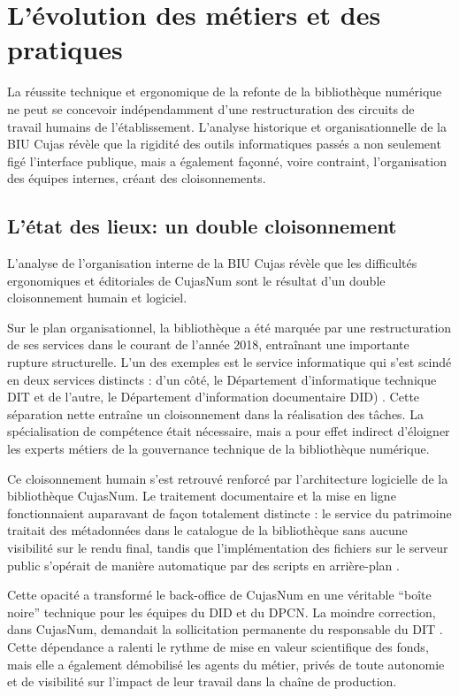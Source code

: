 \section{L'évolution des métiers et des pratiques}
La réussite technique et ergonomique de la refonte de la bibliothèque numérique ne peut se concevoir indépendamment d'une restructuration des circuits de travail humains de l'établissement. L'analyse historique et organisationnelle de la \ac{BIU Cujas} révèle que la rigidité des outils informatiques passés a non seulement figé l'interface publique, mais a également façonné, voire contraint, l'organisation des équipes internes, créant des cloisonnements.

\subsection{L'état des lieux: un double cloisonnement}
L'analyse de l'organisation interne de la \ac{BIU Cujas} révèle que les difficultés ergonomiques et éditoriales de CujasNum sont le résultat d'un double cloisonnement humain et logiciel.

Sur le plan organisationnel, la bibliothèque a été marquée par une restructuration de ses services dans le courant de l'année 2018, entraînant une importante rupture structurelle. L'un des exemples est le service informatique qui s'est scindé en deux services distincts : d'un côté, le Département d'informatique technique \ac{DIT} et de l'autre, le Département d'information documentaire \ac{DID}) . Cette séparation nette entraîne un cloisonnement dans la réalisation des tâches. La spécialisation de compétence était nécessaire, mais a pour effet indirect d'éloigner les experts métiers de la gouvernance technique de la bibliothèque numérique.

Ce cloisonnement humain s'est retrouvé renforcé par l'architecture logicielle de la bibliothèque CujasNum. Le traitement documentaire et la mise en ligne fonctionnaient auparavant de façon totalement distincte : le service du patrimoine traitait des métadonnées dans le catalogue de la bibliothèque sans aucune visibilité sur le rendu final, tandis que l'implémentation des fichiers sur le serveur public s'opérait de manière automatique par des scripts en arrière-plan .

Cette opacité a transformé le back-office de CujasNum en une véritable \enquote{boîte noire} technique pour les équipes du \ac{DID} et du \ac{DPCN}. La moindre correction, dans CujasNum, demandait la sollicitation permanente du responsable du \ac{DIT} . Cette dépendance a ralenti le rythme de mise en valeur scientifique des fonds, mais elle a également démobilisé les agents du métier, privés de toute autonomie et de visibilité sur l'impact de leur travail dans la chaîne de production.

